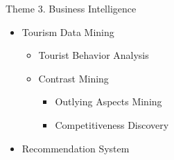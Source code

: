 \documentclass[
 size=14pt,
 paper=smartboard,  %
 mode=present, 		%
 display=slides, 	%
 style=tuliplab,  	%
 pauseslide,
 fleqn,leqno]{powerdot}
\begin{document}

\begin{slide}{Theme 3. Business Intelligence}


\begin{itemize}
\item
Tourism Data Mining

\begin{itemize}
\item
Tourist Behavior Analysis

\item
Contrast Mining

\begin{itemize}

\item
Outlying Aspects Mining

\item
Competitiveness Discovery

\end{itemize}

\end{itemize}

\item
Recommendation System

\end{itemize}

\end{slide}
\end{document}
